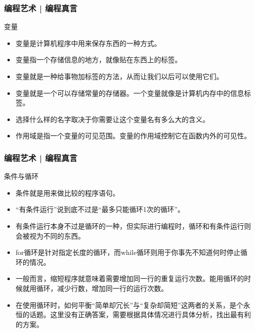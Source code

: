 \begin{frame}
  \frametitle{编程艺术 | 编程真言}
  \begin{block}{变量}
    \begin{itemize}
      \item 变量是计算机程序中用来保存东西的一种方式。
      \item 变量指一个存储信息的地方，就像贴在东西上的标签。
      \item 变量就是一种给事物加标签的方法，从而让我们以后可以使用它们。
      \item 变量就是一个可以存储常量的\alert{存储器}。一个变量就像是计算机内存中的信息\alert{标签}。
      \item 选择什么样的名字取决于你需要让这个变量名有多么大的含义。
      \item 作用域是指一个变量的可见范围。变量的作用域控制它在函数内外的可见性。
    \end{itemize}
  \end{block}
\end{frame}

\begin{frame}
  \frametitle{编程艺术 | 编程真言}
  \begin{block}{条件与循环}
    \begin{itemize}
      \item 条件就是用来做比较的程序语句。
      \item “有条件运行”说到底不过是“最多只能循环1次的循环”。
      \item 有条件运行本身不过是循环的一种，但实际进行编程时，循环和有条件运行则会被视为不同的东西。
      \item for循环是针对指定长度的循环，而while循环则用于你事先不知道何时停止循环的情况。
      \item 一般而言，缩短程序就意味着需要增加同一行的重复运行次数。能用循环的时候就用循环，减少行数，增加同一行的运行次数。
      \item 在使用循环时，如何平衡“简单却冗长”与“复杂却简短”这两者的关系，是个永恒的话题。这里没有正确答案，需要根据具体情况进行具体分析，找出最有利的方案。
    \end{itemize}
  \end{block}
\end{frame}

